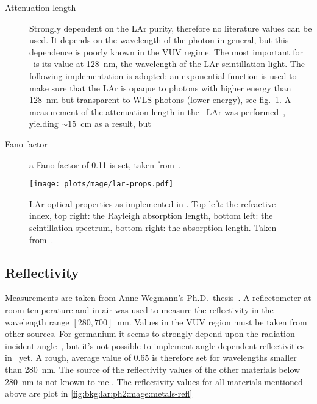 \begin{description}
  \item[Attenuation length] Strongly dependent on the LAr purity, therefore no literature
    values can be used. It depends on the wavelength of the photon in general, but this
    dependence is poorly known in the VUV regime.  The most important for \gerda\ is its
    value at 128~nm, the wavelength of the LAr scintillation light. The following
    implementation is adopted: an exponential function is used to make sure that the LAr
    is opaque to photons with higher energy than 128~nm but transparent to WLS photons
    (lower energy), see fig.~\ref{fig:bkg:lar:ph2:mage:lar-props}. A measurement of the
    attenuation length in the \gerda\ LAr was performed~\cite{Barros2020}, yielding
    $\sim15$~cm as a result, but 

  \item[Fano factor] a Fano factor of 0.11 is set, taken from~\cite{Doke1976}.

\end{description}

\begin{figure}
  \centering
  \texttt{[image: plots/mage/lar-props.pdf]}
  \caption{%
    LAr optical properties as implemented in \mage. Top left: the refractive index, top
    right: the Rayleigh absorption length, bottom left: the scintillation spectrum, bottom
    right: the absorption length. Taken from~\cite{Bideau-Mehu1981, Seidel2002,
    Heindl2010}.
  }\label{fig:bkg:lar:ph2:mage:lar-props}
\end{figure}

\subsection{Reflectivity}

Measurements are taken from Anne Wegmann's Ph.D.~thesis~\cite{Wegmann2017}. A
reflectometer at room temperature and in air was used to measure the reflectivity in the
wavelength range $[280, 700]$~nm. Values in the VUV region must be taken from other
sources. For germanium it seems to strongly depend upon the radiation incident
angle~\cite{Marton1967}, but it's not possible to implement angle-dependent reflectivities
in \geant\ yet.  A rough, average value of 0.65 is therefore set for wavelengths smaller
than 280~nm.  The source of the reflectivity values of the other materials below 280~nm is
not known to me .  The reflectivity values for all materials mentioned
above are plot in \cref{fig:bkg:lar:ph2:mage:metals-refl}

